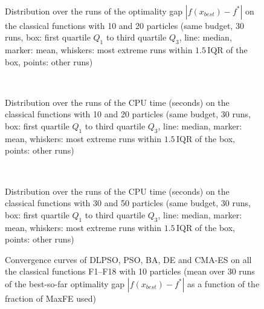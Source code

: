 \begin{figure}[!htbp]
    \centering
    \\[0.2cm]
    \caption{Distribution over the runs of the optimality gap $|f(x_{best})-f^*|$ on the classical functions with 10 and 20 particles (same budget, 30 runs, box: first quartile $Q_1$ to third quartile $Q_3$, line: median, marker: mean, whiskers: most extreme runs within $1.5\,\mathrm{IQR}$ of the box, points: other runs)}
    \label{benchmarkop}
\end{figure}

\begin{figure}[!htbp]
    \centering
    \\[0.2cm]
    \caption{Distribution over the runs of the CPU time (seconds) on the classical functions with 10 and 20 particles (same budget, 30 runs, box: first quartile $Q_1$ to third quartile $Q_3$, line: median, marker: mean, whiskers: most extreme runs within $1.5\,\mathrm{IQR}$ of the box, points: other runs)}
    \label{benchmarktime}
\end{figure}

\begin{figure}[!htbp]
    \centering
    \\[0.2cm]
    \caption{Distribution over the runs of the CPU time (seconds) on the classical functions with 30 and 50 particles (same budget, 30 runs, box: first quartile $Q_1$ to third quartile $Q_3$, line: median, marker: mean, whiskers: most extreme runs within $1.5\,\mathrm{IQR}$ of the box, points: other runs)}
    \label{benchmarktime2}
\end{figure}

\begin{figure}[!htbp]
    \centering
    \caption{Convergence curves of DLPSO, PSO, BA, DE and CMA-ES on all the classical functions F1--F18 with 10 particles (mean over 30 runs of the best-so-far optimality gap $|f(x_{best})-f^*|$ as a function of the fraction of MaxFE used)}
    \label{fig:conv_low_10}
\end{figure}

